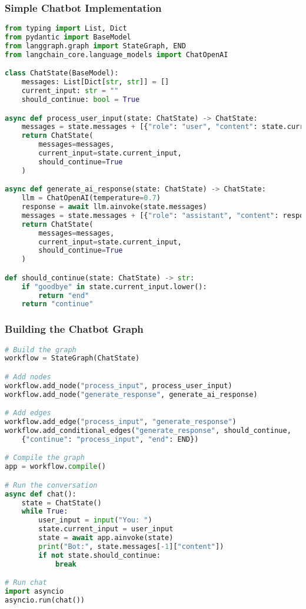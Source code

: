 \begin{frame}[fragile]\frametitle{Simple Chatbot Implementation}
      \begin{lstlisting}[language=Python, basicstyle=\tiny]
from typing import List, Dict
from pydantic import BaseModel
from langgraph.graph import StateGraph, END
from langchain_core.language_models import ChatOpenAI

class ChatState(BaseModel):
    messages: List[Dict[str, str]] = []
    current_input: str = ""
    should_continue: bool = True

async def process_user_input(state: ChatState) -> ChatState:
    messages = state.messages + [{"role": "user", "content": state.current_input}]
    return ChatState(
        messages=messages,
        current_input=state.current_input,
        should_continue=True
    )

async def generate_ai_response(state: ChatState) -> ChatState:
    llm = ChatOpenAI(temperature=0.7)
    response = await llm.ainvoke(state.messages)
    messages = state.messages + [{"role": "assistant", "content": response}]
    return ChatState(
        messages=messages,
        current_input=state.current_input,
        should_continue=True
    )

def should_continue(state: ChatState) -> str:
    if "goodbye" in state.current_input.lower():
        return "end"
    return "continue"
      \end{lstlisting}
\end{frame}

\begin{frame}[fragile]\frametitle{Building the Chatbot Graph}
      \begin{lstlisting}[language=Python, basicstyle=\tiny]
# Build the graph
workflow = StateGraph(ChatState)

# Add nodes
workflow.add_node("process_input", process_user_input)
workflow.add_node("generate_response", generate_ai_response)

# Add edges
workflow.add_edge("process_input", "generate_response")
workflow.add_conditional_edges("generate_response", should_continue, 
    {"continue": "process_input", "end": END})

# Compile the graph
app = workflow.compile()

# Run the conversation
async def chat():
    state = ChatState()
    while True:
        user_input = input("You: ")
        state.current_input = user_input
        state = await app.ainvoke(state)
        print("Bot:", state.messages[-1]["content"])
        if not state.should_continue:
            break

# Run chat
import asyncio
asyncio.run(chat())			
      \end{lstlisting}
\end{frame}



